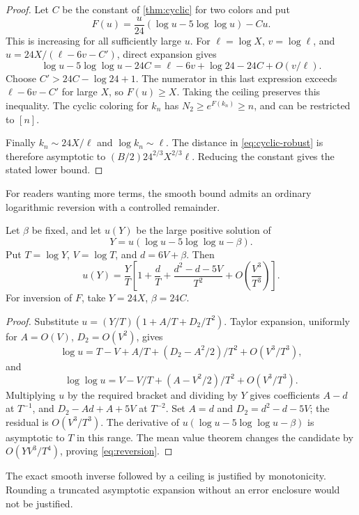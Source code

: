 \begin{proof}
Let \(C\) be the constant of \cref{thm:cyclic} for two colors and put
\[
 F(u)=\frac u{24}(\log u-5\log\log u)-Cu.
\]
This is increasing for all sufficiently large \(u\).
For \(\ell=\log X\), \(v=\log\ell\), and
\(u=24X/(\ell-6v-C')\), direct expansion gives
\[
 \log u-5\log\log u-24C
 =\ell-6v+\log24-24C+O(v/\ell).
\]
Choose \(C'>24C-\log24+1\).
The numerator in this last expression exceeds
\(\ell-6v-C'\) for large \(X\), so \(F(u)\ge X\).
Taking the ceiling preserves this inequality.
The cyclic coloring for \(k_n\) has \(N_2\ge e^{F(k_n)}\ge n\),
and can be restricted to \([n]\).

Finally
\(k_n\sim24X/\ell\) and \(\log k_n\sim\ell\).
The distance in \eqref{eq:cyclic-robust} is therefore asymptotic to
\((B/2)24^{2/3}X^{2/3}\ell\). Reducing the constant gives the
stated lower bound.
\end{proof}

For readers wanting more terms, the smooth bound admits an ordinary
logarithmic reversion with a controlled remainder.

\begin{proposition}\label{prop:reversion}
Let \(\beta\) be fixed, and let \(u(Y)\) be the large positive solution
of
\[
 Y=u(\log u-5\log\log u-\beta).
\]
Put \(T=\log Y\), \(V=\log T\), and \(d=6V+\beta\).
Then
\begin{equation}\label{eq:reversion}
 u(Y)=\frac YT\left[
 1+\frac dT+\frac{d^2-d-5V}{T^2}
 +O\!\left(\frac{V^3}{T^3}\right)\right].
\end{equation}
For inversion of \(F\), take \(Y=24X\), \(\beta=24C\).
\end{proposition}

\begin{proof}
Substitute \(u=(Y/T)(1+A/T+D_2/T^2)\). Taylor expansion, uniformly
for \(A=O(V)\), \(D_2=O(V^2)\), gives
\[
 \log u=T-V+A/T+(D_2-A^2/2)/T^2+O(V^3/T^3),
\]
and
\[
 \log\log u=V-V/T+(A-V^2/2)/T^2+O(V^3/T^3).
\]
Multiplying \(u\) by the required bracket and dividing by \(Y\)
gives coefficients \(A-d\) at \(T^{-1}\), and
\(D_2-Ad+A+5V\) at \(T^{-2}\).
Set \(A=d\) and \(D_2=d^2-d-5V\); the residual is
\(O(V^3/T^3)\).
The derivative of \(u(\log u-5\log\log u-\beta)\) is asymptotic to
\(T\) in this range. The mean value theorem changes the candidate
by \(O(YV^3/T^4)\), proving \eqref{eq:reversion}.
\end{proof}

The exact smooth inverse followed by a ceiling is justified by
monotonicity. Rounding a truncated asymptotic expansion without an
error enclosure would not be justified.

